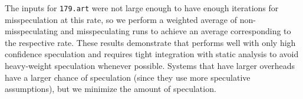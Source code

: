 The inputs for \texttt{179.art} were not large enough to have
enough iterations for misspeculation at this rate, so we perform a
weighted average of non-misspeculating and misspeculating runs to achieve
an average corresponding to the respective rate.
These results demonstrate that \name performs well with only high
confidence speculation and requires tight integration with static analysis
to avoid heavy-weight speculation whenever possible.
Systems that have larger overheads have a larger chance of speculation (since
they use more speculative assumptions), but we minimize the amount of speculation.



